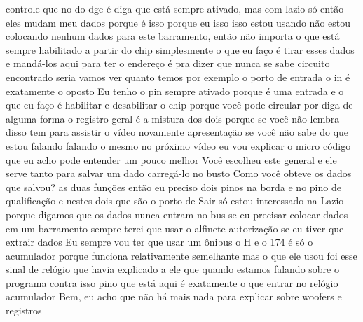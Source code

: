 \documentclass[oneside,11pt]{memoir} %
\begin{document}
controle que no do dge é  diga que está sempre ativado, mas  com lazio só então eles mudam meu  dados porque é isso porque eu isso isso  estou usando não estou colocando nenhum  dados para este barramento, então não importa o que  está sempre habilitado a partir do chip  simplesmente o que eu faço é tirar  esses dados e mandá-los aqui para ter  o endereço é pra dizer que nunca se sabe  circuito encontrado seria  vamos ver quanto temos por exemplo  o porto de entrada  o in é exatamente o oposto  Eu tenho o pin sempre ativado  porque é uma entrada e o que eu faço  é habilitar e desabilitar o chip  porque você pode circular por  diga de alguma forma  o registro geral é a mistura dos  dois porque se você não lembra disso tem  para assistir o vídeo novamente  apresentação se você não sabe do que estou falando  falando o mesmo no próximo vídeo eu vou  explicar o micro código que eu acho  pode entender um pouco melhor  Você escolheu este general e ele serve tanto para  salvar um dado carregá-lo no busto  Como você obteve os dados que salvou?  as duas funções então eu preciso  dois pinos na borda e no pino de  qualificação  e nestes dois que são o porto de  Sair só estou interessado na Lazio  porque digamos que os dados nunca entram no  bus se eu precisar colocar dados em um barramento  sempre terei que usar o alfinete  autorização se eu tiver que extrair dados  Eu sempre vou ter que usar um ônibus  o H  e o 174 é só o acumulador  porque funciona relativamente semelhante  mas o que ele usou foi esse sinal de  relógio que havia explicado a ele que quando  estamos falando sobre o programa contra isso  pino que está aqui é exatamente o que  entrar no relógio acumulador  Bem, eu acho que não há mais nada para  explicar sobre woofers e registros 

\end{document}
